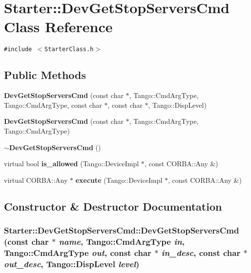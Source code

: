\section{Starter::Dev\-Get\-Stop\-Servers\-Cmd  Class Reference}
\label{classStarter_1_1DevGetStopServersCmd}
{\tt \#include $<$Starter\-Class.h$>$}

\subsection*{Public Methods}
\begin{CompactItemize}
\item 
{\bf Dev\-Get\-Stop\-Servers\-Cmd} (const char $\ast$, Tango::Cmd\-Arg\-Type, Tango::Cmd\-Arg\-Type, const char $\ast$, const char $\ast$, Tango::Disp\-Level)
\item 
{\bf Dev\-Get\-Stop\-Servers\-Cmd} (const char $\ast$, Tango::Cmd\-Arg\-Type, Tango::Cmd\-Arg\-Type)
\item 
{\bf $\sim$Dev\-Get\-Stop\-Servers\-Cmd} ()
\item 
virtual bool {\bf is\_\-allowed} (Tango::Device\-Impl $\ast$, const CORBA::Any \&)
\item 
virtual CORBA::Any $\ast$ {\bf execute} (Tango::Device\-Impl $\ast$, const CORBA::Any \&)
\end{CompactItemize}


\subsection{Constructor \& Destructor Documentation}
\subsubsection{\setlength{\rightskip}{0pt plus 5cm}Starter::Dev\-Get\-Stop\-Servers\-Cmd::Dev\-Get\-Stop\-Servers\-Cmd (const char $\ast$ {\em name}, Tango::Cmd\-Arg\-Type {\em in}, Tango::Cmd\-Arg\-Type {\em out}, const char $\ast$ {\em in\_\-desc}, const char $\ast$ {\em out\_\-desc}, Tango::Disp\-Level {\em level})}\label{classStarter_1_1DevGetStopServersCmd_a0}



